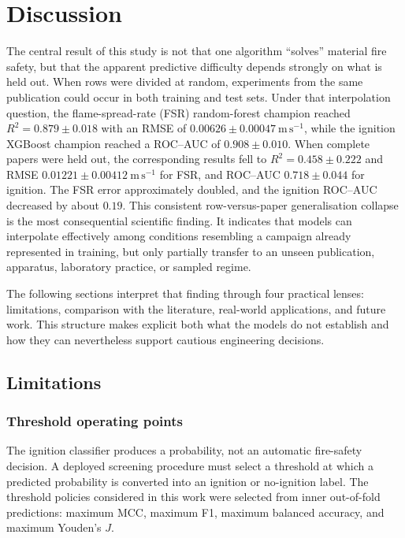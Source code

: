 \chapter{Discussion}
\label{chap:discussion}

The central result of this study is not that one algorithm ``solves'' material fire safety, but that the apparent predictive difficulty depends strongly on what is held out. When rows were divided at random, experiments from the same publication could occur in both training and test sets. Under that interpolation question, the flame-spread-rate (FSR) random-forest champion reached \(R^2=0.879\pm0.018\) with an RMSE of \(0.00626\pm0.00047~\mathrm{m\,s^{-1}}\), while the ignition XGBoost champion reached a ROC--AUC of \(0.908\pm0.010\). When complete papers were held out, the corresponding results fell to \(R^2=0.458\pm0.222\) and RMSE \(0.01221\pm0.00412~\mathrm{m\,s^{-1}}\) for FSR, and ROC--AUC \(0.718\pm0.044\) for ignition. The FSR error approximately doubled, and the ignition ROC--AUC decreased by about \(0.19\). This consistent row-versus-paper generalisation collapse is the most consequential scientific finding. It indicates that models can interpolate effectively among conditions resembling a campaign already represented in training, but only partially transfer to an unseen publication, apparatus, laboratory practice, or sampled regime.

The following sections interpret that finding through four practical lenses:
limitations, comparison with the literature, real-world applications, and
future work. This structure makes explicit both what the models do not establish
and how they can nevertheless support cautious engineering decisions.
\section{Limitations}
\label{sec:discussion_limitations}

\subsection{Threshold operating points}

The ignition classifier produces a probability, not an automatic fire-safety
decision. A deployed screening procedure must select a threshold at which a
predicted probability is converted into an ignition or no-ignition label. The
threshold policies considered in this work were selected from inner
out-of-fold predictions: maximum MCC, maximum F1, maximum balanced accuracy,
and maximum Youden's \(J\).


